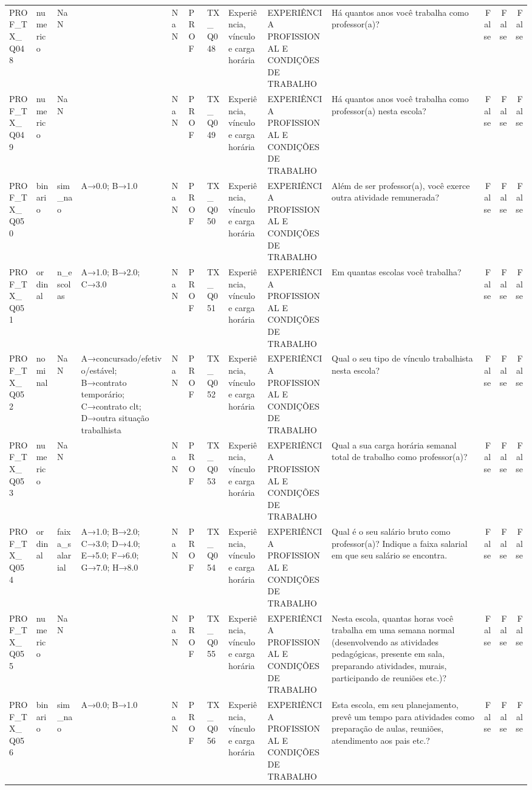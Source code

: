 \begin{tabular}{llllllllllrrr}
PROF\_TX\_Q048 & numerico & NaN &  & NaN & PROF & TX\_Q048 & Experiência, vínculo e carga horária & EXPERIÊNCIA PROFISSIONAL E CONDIÇÕES DE TRABALHO & Há quantos anos você trabalha como professor(a)? & False & False & False \\
PROF\_TX\_Q049 & numerico & NaN &  & NaN & PROF & TX\_Q049 & Experiência, vínculo e carga horária & EXPERIÊNCIA PROFISSIONAL E CONDIÇÕES DE TRABALHO & Há quantos anos você trabalha como professor(a) nesta escola? & False & False & False \\
PROF\_TX\_Q050 & binario & sim\_nao & A→0.0; B→1.0 & NaN & PROF & TX\_Q050 & Experiência, vínculo e carga horária & EXPERIÊNCIA PROFISSIONAL E CONDIÇÕES DE TRABALHO & Além de ser professor(a), você exerce outra atividade remunerada? & False & False & False \\
PROF\_TX\_Q051 & ordinal & n\_escolas & A→1.0; B→2.0; C→3.0 & NaN & PROF & TX\_Q051 & Experiência, vínculo e carga horária & EXPERIÊNCIA PROFISSIONAL E CONDIÇÕES DE TRABALHO & Em quantas escolas você trabalha? & False & False & False \\
PROF\_TX\_Q052 & nominal & NaN & A→concursado/efetivo/estável; B→contrato temporário; C→contrato clt; D→outra situação trabalhista & NaN & PROF & TX\_Q052 & Experiência, vínculo e carga horária & EXPERIÊNCIA PROFISSIONAL E CONDIÇÕES DE TRABALHO & Qual o seu tipo de vínculo trabalhista nesta escola? & False & False & False \\
PROF\_TX\_Q053 & numerico & NaN &  & NaN & PROF & TX\_Q053 & Experiência, vínculo e carga horária & EXPERIÊNCIA PROFISSIONAL E CONDIÇÕES DE TRABALHO & Qual a sua carga horária semanal total de trabalho como professor(a)? & False & False & False \\
PROF\_TX\_Q054 & ordinal & faixa\_salarial & A→1.0; B→2.0; C→3.0; D→4.0; E→5.0; F→6.0; G→7.0; H→8.0 & NaN & PROF & TX\_Q054 & Experiência, vínculo e carga horária & EXPERIÊNCIA PROFISSIONAL E CONDIÇÕES DE TRABALHO & Qual é o seu salário bruto como professor(a)? Indique a faixa salarial em que seu salário se encontra. & False & False & False \\
PROF\_TX\_Q055 & numerico & NaN &  & NaN & PROF & TX\_Q055 & Experiência, vínculo e carga horária & EXPERIÊNCIA PROFISSIONAL E CONDIÇÕES DE TRABALHO & Nesta escola, quantas horas você trabalha em uma semana normal (desenvolvendo as atividades pedagógicas, presente em sala, preparando atividades, murais, participando de reuniões etc.)? & False & False & False \\
PROF\_TX\_Q056 & binario & sim\_nao & A→0.0; B→1.0 & NaN & PROF & TX\_Q056 & Experiência, vínculo e carga horária & EXPERIÊNCIA PROFISSIONAL E CONDIÇÕES DE TRABALHO & Esta escola, em seu planejamento, prevê um tempo para atividades como preparação de aulas, reuniões, atendimento aos pais etc.? & False & False & False \\

\end{tabular}
